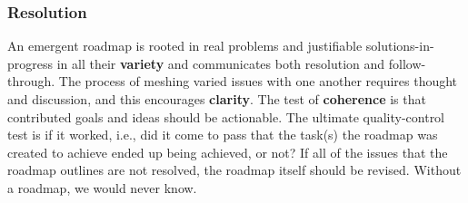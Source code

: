 \subsubsection*{Resolution}
An emergent roadmap is rooted in real problems and justifiable
solutions-in-progress in all their \textbf{variety} and communicates
both resolution and follow-through.  The process of meshing varied
issues with one another requires thought and discussion, and this
encourages \textbf{clarity}.  The test of \textbf{coherence} is that
contributed goals and ideas should be actionable.
%
The ultimate quality-control test is if it worked, i.e., did it come to pass that the task(s) the roadmap was created to achieve ended up being achieved, or not?  If all of the issues that the roadmap outlines are not resolved, the roadmap itself should be revised. Without a roadmap, we would never know.

